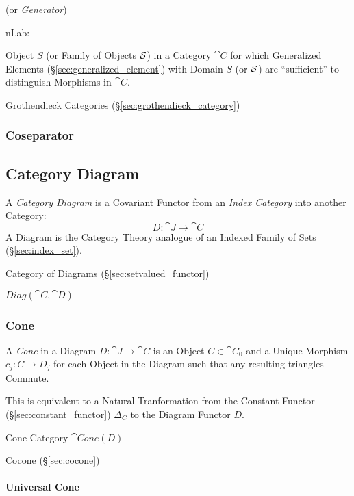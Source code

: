 (or \emph{Generator})

nLab:

Object $S$ (or Family of Objects $\mathcal{S}$) in a Category $\cat{C}$
for which Generalized Elements (\S\ref{sec:generalized_element}) with
Domain $S$ (or $\mathcal{S}$) are ``sufficient'' to distinguish
Morphisms in $\cat{C}$.

Grothendieck Categories (\S\ref{sec:grothendieck_category})



\subsubsection{Coseparator}\label{sec:coseparator}



\subsection{Category Diagram}\label{sec:category_diagram}

A \emph{Category Diagram} is a Covariant Functor from an \emph{Index
  Category} into another Category:
\[
  D : \cat{J} \rightarrow \cat{C}
\]
A Diagram is the Category Theory analogue of an Indexed Family of Sets
(\S\ref{sec:index_set}).

Category of Diagrams (\S\ref{sec:setvalued_functor})

$Diag(\cat{C},\cat{D})$



\subsubsection{Cone}\label{sec:category_cone}

A \emph{Cone} in a Diagram $D : \cat{J} \rightarrow \cat{C}$ is
an Object $C \in \cat{C}_0$ and a Unique Morphism $c_j : C
\rightarrow D_j$ for each Object in the Diagram such that any
resulting triangles Commute.

This is equivalent to a Natural Tranformation from the Constant
Functor (\S\ref{sec:constant_functor}) $\Delta_C$ to the Diagram
Functor $D$.

Cone Category $\cat{Cone}(D)$

Cocone (\S\ref{sec:cocone})



\paragraph{Universal Cone}\label{sec:universal_cone}\hfill

